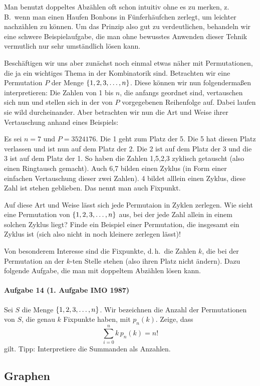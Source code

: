 \documentclass[11pt,a4paper]{article}
\begin{document}
Man benutzt doppeltes Abzählen oft schon intuitiv ohne es zu merken,
z.\,B.\ wenn man einen Haufen Bonbons in Fünferhäufchen zerlegt, um leichter
nachzählen zu können. Um das Prinzip also gut zu verdeutlichen, behandeln wir
eine schwere Beispielaufgabe, die man ohne bewusstes Anwenden dieser Tehnik
vermutlich nur sehr umständlich lösen kann.

Beschäftigen wir uns aber zunächst noch einmal etwas näher mit Permutationen,
die ja ein wichtiges Thema in der Kombinatorik sind. Betrachten wir eine
Permutation $P$ der Menge $\left\{1,2,3,\dots ,n\right\}$. Diese können wir nun
folgendermaßen interpretieren: Die Zahlen von 1 bis $n$, die anfangs geordnet
sind, vertauschen sich nun und stellen sich in der von $P$ vorgegebenen
Reihenfolge auf. Dabei laufen sie wild durcheinander. Aber betrachten wir nun
die Art und Weise ihrer Vertauschung anhand eines Beispiels:

Es sei $n=7$ und $P=3524176$. Die 1 geht zum Platz der 5. Die 5 hat diesen
Platz verlassen und ist nun auf dem Platz der 2. Die 2 ist auf dem Platz der 3
und die 3 ist auf dem Platz der 1. So haben die Zahlen 1,5,2,3 zyklisch
getauscht (also einen Ringtausch gemacht). Auch 6,7 bilden einen Zyklus (in
Form einer einfachen Vertauschung dieser zwei Zahlen). 4 bildet alllein einen
Zyklus, diese Zahl ist stehen geblieben. Das nennt man auch Fixpunkt.

Auf diese Art und Weise lässt sich jede Permutaion in Zyklen zerlegen. Wie
sieht eine Permutation von $\left\{1,2,3,\dots ,n\right\}$ aus, bei der jede Zahl
allein in einem solchen Zyklus liegt? Finde ein Beispiel einer Permutation,
die insgesamt ein Zyklus ist (sich also nicht in noch kleinere zerlegen
lässt)!

Von besonderem Interesse sind die Fixpunkte, d.\,h.\ die Zahlen $k$, die bei
der Permutation an der $k$-ten Stelle stehen (also ihren Platz nicht ändern).
Dazu folgende Aufgabe, die man mit doppeltem Abzählen lösen kann.

\paragraph{Aufgabe 14 (1. Aufgabe IMO 1987)} 
Sei $S$ die Menge $\left\{1,2,3,\dots ,n\right\}$. Wir bezeichnen die Anzahl der
Permutationen von $S$, die genau $k$ Fixpunkte haben, mit $p_{n}(k)$. Zeige,
dass
\[\sum_{i=0}^{n} k\,p_{n}(k)=n!\]
gilt.  Tipp: Interpretiere die Summanden als Anzahlen.

\subsection*{Graphen}
\end{document}
